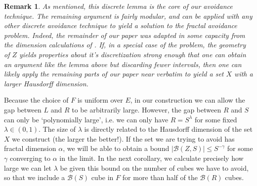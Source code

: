 \documentclass{article}
\theoremstyle{plain}
\theoremstyle{plain}
\newtheorem*{remark}{Remark}
\begin{document}
\begin{remark}
	As mentioned, this discrete lemma is the core of our avoidance technique. The remaining argument is fairly modular, and can be applied with any other discrete avoidance technique to yield a solution to the fractal avoidance problem. Indeed, the remainder of our paper was adapted in some capacity from the dimension calculations of \cite{MalabikaRob}. If, in a special case of the problem, the geometry of $Z$ yields properties about it's discretization strong enough that one can obtain an argument like the lemma above but discarding fewer intervals, then one can likely apply the remaining parts of our paper near verbatim to yield a set $X$ with a larger Hausdorff dimension.
\end{remark}

Because the choice of $F$ is uniform over $E$, in our construction we can allow the gap between $L$ and $R$ to be arbitrarily large. However, the gap between $R$ and $S$ can only be `polynomially large', i.e. we can only have $R = S^\lambda$ for some fixed $\lambda \in (0,1)$. The size of $\lambda$ is directly related to the Hausdorff dimension of the set $X$ we construct (the larger the better!). If the set we are trying to avoid has fractal dimension $\alpha$, we will be able to obtain a bound $|\mathcal{B}(Z,S)| \leq S^{-\gamma}$ for some $\gamma$ converging to $\alpha$ in the limit. In the next corollary, we calculate precisely how large we can let $\lambda$ be given this bound on the number of cubes we have to avoid, so that we include a $\mathcal{B}(S)$ cube in $F$ for more than half of the $\mathcal{B}(R)$ cubes.
\end{document}
